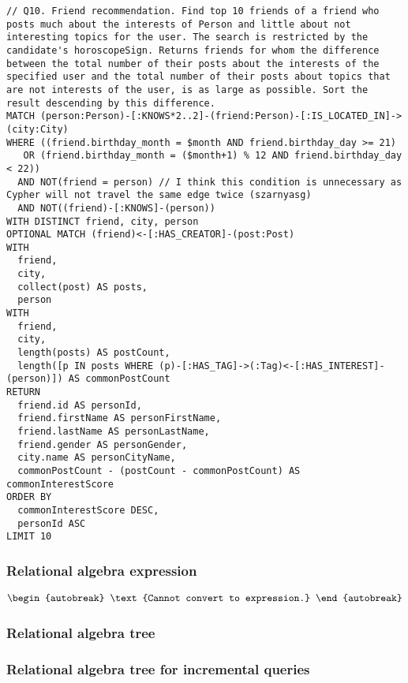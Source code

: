 \begin{lstlisting}
// Q10. Friend recommendation. Find top 10 friends of a friend who posts much about the interests of Person and little about not interesting topics for the user. The search is restricted by the candidate's horoscopeSign. Returns friends for whom the difference between the total number of their posts about the interests of the specified user and the total number of their posts about topics that are not interests of the user, is as large as possible. Sort the result descending by this difference.
MATCH (person:Person)-[:KNOWS*2..2]-(friend:Person)-[:IS_LOCATED_IN]->(city:City)
WHERE ((friend.birthday_month = $month AND friend.birthday_day >= 21)
   OR (friend.birthday_month = ($month+1) % 12 AND friend.birthday_day < 22))
  AND NOT(friend = person) // I think this condition is unnecessary as Cypher will not travel the same edge twice (szarnyasg)
  AND NOT((friend)-[:KNOWS]-(person))
WITH DISTINCT friend, city, person
OPTIONAL MATCH (friend)<-[:HAS_CREATOR]-(post:Post)
WITH
  friend,
  city,
  collect(post) AS posts,
  person
WITH
  friend,
  city,
  length(posts) AS postCount,
  length([p IN posts WHERE (p)-[:HAS_TAG]->(:Tag)<-[:HAS_INTEREST]-(person)]) AS commonPostCount
RETURN
  friend.id AS personId,
  friend.firstName AS personFirstName,
  friend.lastName AS personLastName,
  friend.gender AS personGender,
  city.name AS personCityName,
  commonPostCount - (postCount - commonPostCount) AS commonInterestScore
ORDER BY
  commonInterestScore DESC,
  personId ASC
LIMIT 10
\end{lstlisting}

\subsubsection*{Relational algebra expression}

\begin{align*}
\begin{autobreak}
\text{Cannot convert to expression.}
\end{autobreak}
\end{align*}

\subsubsection*{Relational algebra tree}


\subsubsection*{Relational algebra tree for incremental queries}

